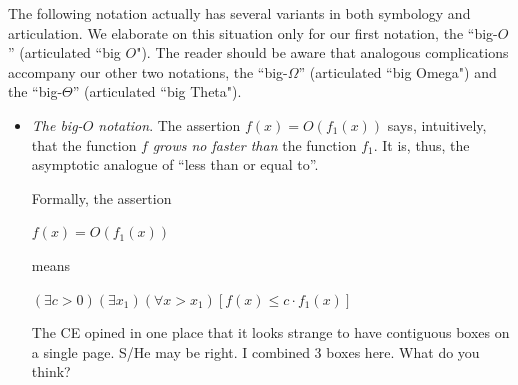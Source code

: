 \smallskip

The following notation actually has several variants in both symbology and articulation.  We elaborate on this situation only for our first notation, the ``big-$O$'' (articulated ``big $O$").  The reader should be aware that analogous complications accompany our other two notations, the ``big-$\Omega$'' (articulated ``big Omega") and the ``big-$\Theta$'' (articulated ``big Theta"). 
 
\begin{itemize}
\item
{\em The big-$O$ notation}.
The assertion $f(x) = O(f_1(x))$ says, intuitively, that the function $f$ {\em grows no faster than} the function $f_1$.  It is, thus, the asymptotic analogue of ``less than or equal to''.

\smallskip

Formally, the assertion

\hspace*{.2in}$f(x) = O(f_1(x))$

means

\hspace*{.2in}
$(\exists c >0)(\exists x_1)(\forall x > x_1)
[f(x) \leq c \cdot f_1(x)]$

\bigskip

{\Arny The CE opined in one place that it looks strange to have contiguous boxes on a single page.  S/He may be right.  I combined 3 boxes here.  What do you think?}

\noindent {}
\end{itemize}
